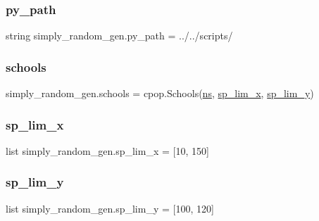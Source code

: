 \subsubsection{\texorpdfstring{py\+\_\+path}{py\_path}}
{\footnotesize\ttfamily string simply\+\_\+random\+\_\+gen.\+py\+\_\+path = \textquotesingle{}../../scripts/\textquotesingle{}}

\mbox{\label{namespacesimply__random__gen_affce97fc974f34e8307f80e156aac92c}} 
\subsubsection{\texorpdfstring{schools}{schools}}
{\footnotesize\ttfamily simply\+\_\+random\+\_\+gen.\+schools = cpop.\+Schools(\hyperlink{namespacesimply__random__gen_a721e7874c49707de4c808d3ab54df4b7}{ns}, \hyperlink{namespacesimply__random__gen_a55170e2a04f67ec4f79d82c14941cf12}{sp\+\_\+lim\+\_\+x}, \hyperlink{namespacesimply__random__gen_a2685d02e22bbd9a87d4bcfd842a2fa10}{sp\+\_\+lim\+\_\+y})}

\mbox{\label{namespacesimply__random__gen_a55170e2a04f67ec4f79d82c14941cf12}} 
\subsubsection{\texorpdfstring{sp\+\_\+lim\+\_\+x}{sp\_lim\_x}}
{\footnotesize\ttfamily list simply\+\_\+random\+\_\+gen.\+sp\+\_\+lim\+\_\+x = \mbox{[}10, 150\mbox{]}}

\mbox{\label{namespacesimply__random__gen_a2685d02e22bbd9a87d4bcfd842a2fa10}} 
\subsubsection{\texorpdfstring{sp\+\_\+lim\+\_\+y}{sp\_lim\_y}}
{\footnotesize\ttfamily list simply\+\_\+random\+\_\+gen.\+sp\+\_\+lim\+\_\+y = \mbox{[}100, 120\mbox{]}}

